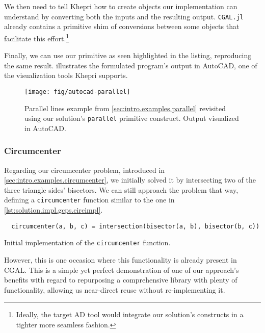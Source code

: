 We then need to tell Khepri how to create objects our implementation can
understand by converting both the inputs and the resulting output.
\texttt{CGAL.jl} already contains a primitive shim of conversions between some
objects that facilitate this effort.\footnote{Ideally, the target \ac{AD} tool
would integrate our solution's constructs in a tighter more seamless fashion.}

Finally, we can use our primitive as seen highlighted in the listing,
reproducing the same result.  illustrates
the formulated program's output in AutoCAD, one of the visualization tools
Khepri supports.

\begin{figure}[htbp]
  \texttt{[image: fig/autocad-parallel]} 
  \caption[Parallel lines example using our solution]{
    Parallel lines example from \cref{sec:intro.examples.parallel} revisited
    using our solution's \texttt{parallel} primitive construct.  Output
    visualized in AutoCAD.}%
  \label{fig:solution.impl.gcps.parallel}
\end{figure}

\subsubsection{Circumcenter}%
\label{sec:solution.impl.gcps.circumcenter}

Regarding our circumcenter problem, introduced in
\cref{sec:intro.examples.circumcenter}, we initially solved it by intersecting
two of the three triangle sides' bisectors.  We can still approach the problem
that way, defining a \texttt{circumcenter} function similar to the one in
\cref{lst:solution.impl.gcps.circimpl}.

\begin{listing}[htbp]
  \begin{verbatim}
  circumcenter(a, b, c) = intersection(bisector(a, b), bisector(b, c)) 
  \end{verbatim}
  \caption[Initial circumcenter solution]{
    Initial implementation of the \texttt{circumcenter} function.}%
  \label{lst:solution.impl.gcps.circimpl}
\end{listing}

However, this is one occasion where this functionality is already present in
\ac{CGAL}.  This is a simple yet perfect demonstration of one of our approach's
benefits with regard to repurposing a comprehensive library with plenty of
functionality, allowing us near-direct reuse without re-implementing it.

